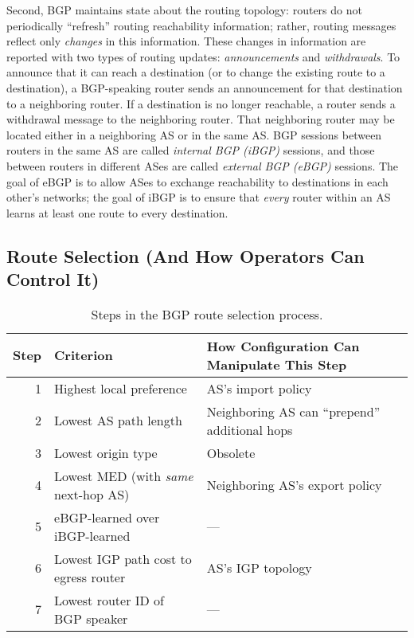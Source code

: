 Second, BGP maintains state about the routing topology: routers do not
periodically ``refresh'' routing reachability information; rather,
routing messages reflect only {\em changes} in this information.  These
changes in information are reported with two types of routing updates:
{\em announcements} and {\em withdrawals}.  To announce that it can
reach a destination (or to change the existing route to a destination),
a BGP-speaking router sends an announcement for that destination to a
neighboring router.  If a destination is no longer reachable, a router
sends a withdrawal message to the neighboring router.  That neighboring
router may be located either in a neighboring AS or in the same AS.  BGP
sessions between routers in the same AS are called {\em internal BGP
(iBGP)} sessions, and those between routers in different ASes are called
{\em external BGP (eBGP)} sessions.  The goal of eBGP is to allow ASes
to exchange reachability to destinations in each other's networks; the
goal of iBGP is to ensure that {\em every} router within an AS learns at
least one route to every destination.


\subsection{Route Selection (And How Operators Can Control
It)}\label{sec:bg:route_selection} 

\begin{table}
\begin{small}
\begin{center}
\begin{tabular}{r|l|l} 
{\bf Step} & {\bf Criterion} & {\bf How Configuration Can Manipulate
This Step} \\ \hline
1 & Highest local preference & AS's import policy \\
2 & Lowest AS path length & Neighboring AS can ``prepend'' additional hops \\
{\color{Gray} 3} & {\color{Gray} Lowest origin type}   & {\color{Gray} Obsolete} \\
4 & Lowest MED (with {\em same\/} next-hop AS) & Neighboring AS's export
policy \\
5 & eBGP-learned over iBGP-learned  & ---\\
6 & Lowest IGP path cost to egress router & AS's IGP topology \\
7 & Lowest router ID of BGP speaker & --- \\
\end{tabular}
\end{center}
\end{small}
\caption{Steps in the BGP route selection process.}
\label{tab:background:decision}
\end{table}


